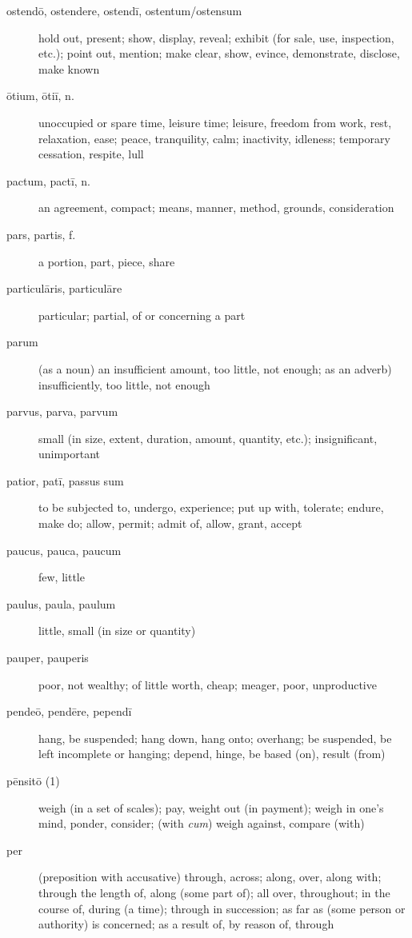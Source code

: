 \begin{description}
    \item[ostendō, ostendere, ostendī, ostentum/ostensum] \marginnote{*}hold out, present; show, display, reveal; exhibit (for sale, use, inspection, etc.); point out, mention; make clear, show, evince, demonstrate, disclose, make known
    \item[ōtium, ōtiī, n.] \marginnote{*}unoccupied or spare time, leisure time; leisure, freedom from work, rest, relaxation, ease; peace, tranquility, calm; inactivity, idleness; temporary cessation, respite, lull
    \item[pactum, pactī, n.] an agreement, compact; means, manner, method, grounds, consideration
    \item[pars, partis, f.] \marginnote{*}a portion, part, piece, share
    \item[particulāris, particulāre] particular; partial, of or concerning a part
    \item[parum] (as a noun) an insufficient amount, too little, not enough; as an adverb) insufficiently, too little, not enough
    \item[parvus, parva, parvum] \marginnote{*}small (in size, extent, duration, amount, quantity, etc.); insignificant, unimportant
    \item[patior, patī, passus sum] \marginnote{*}to be subjected to, undergo, experience; put up with, tolerate; endure, make do; allow, permit; admit of, allow, grant, accept
    \item[paucus, pauca, paucum] \marginnote{*}few, little
    \item[paulus, paula, paulum] \marginnote{*}little, small (in size or quantity)
    \item[pauper, pauperis] \marginnote{*}poor, not wealthy; of little worth, cheap; meager, poor, unproductive
    \item[pendeō, pendēre, pependī] hang, be suspended; hang down, hang onto; overhang; be suspended, be left incomplete or hanging; depend, hinge, be based (on), result (from)
    \item[pēnsitō (1)] weigh (in a set of scales); pay, weight out (in payment); weigh in one's mind, ponder, consider; (with \textit{cum}) weigh against, compare (with)
    \item[per] \marginnote{*}(preposition with accusative) through, across; along, over, along with; through the length of, along (some part of); all over, throughout; in the course of, during (a time); through in succession; as far as (some person or authority) is concerned; as a result of, by reason of, through

\end{description}
